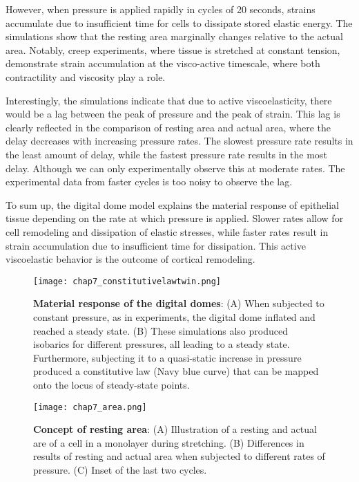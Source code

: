 However, when pressure is applied rapidly in cycles of 20 seconds, strains accumulate due to insufficient time for cells to dissipate stored elastic energy. The simulations show that the resting area marginally changes relative to the actual area. Notably, creep experiments, where tissue is stretched at constant tension, demonstrate strain accumulation at the visco-active timescale, where both contractility and viscosity play a role.

Interestingly, the simulations indicate that due to active viscoelasticity, there would be a lag between the peak of pressure and the peak of strain. This lag is clearly reflected in the comparison of resting area and actual area, where the delay decreases with increasing pressure rates. The slowest pressure rate results in the least amount of delay, while the fastest pressure rate results in the most delay. Although we can only experimentally observe this at moderate rates. The experimental data from faster cycles is too noisy to observe the lag.

To sum up, the digital dome model explains the material response of epithelial tissue depending on the rate at which pressure is applied. Slower rates allow for cell remodeling and dissipation of elastic stresses, while faster rates result in strain accumulation due to insufficient time for dissipation. This active viscoelastic behavior is the outcome of cortical remodeling.

\begin{figure}[t]
	\centering
	\texttt{[image: chap7\_constitutivelawtwin.png]}
	\caption{\label{fig_7_7} \textbf{Material response of the digital domes}: (A)  When subjected to constant pressure, as in experiments, the digital dome inflated and reached a steady state. (B)  These simulations also produced isobarics for different pressures, all leading to a steady state. Furthermore, subjecting it to a quasi-static increase in pressure produced a constitutive law (Navy blue curve) that can be mapped onto the locus of steady-state points.}
\end{figure}

\begin{figure}
	\centering
	\texttt{[image: chap7\_area.png]}
	\caption{\label{fig_7_8} \textbf{Concept of resting area}: (A) Illustration of a resting and actual are of a cell in a monolayer during stretching. (B) Differences in results of resting and actual area when subjected to different rates of pressure. (C) Inset of the last two cycles.
	}
\end{figure}

